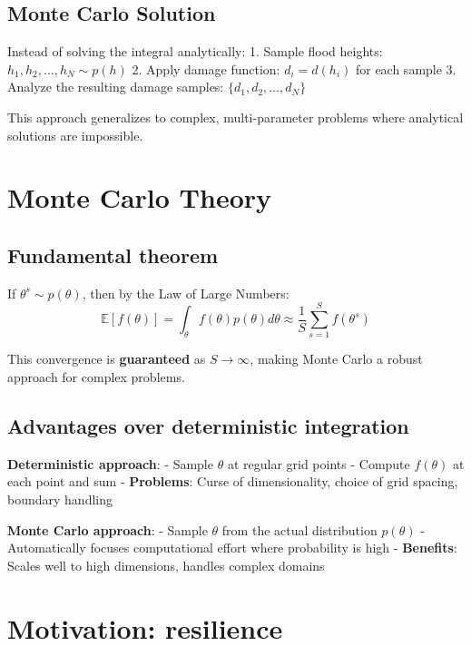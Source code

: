 \documentclass[
  letterpaper,
  DIV=11,
  numbers=noendperiod]{scrreprt}
\begin{document}
\subsection{Monte Carlo Solution}\label{monte-carlo-solution}

Instead of solving the integral analytically: 1. Sample flood heights:
\(h_1, h_2, \ldots, h_N \sim p(h)\) 2. Apply damage function:
\(d_i = d(h_i)\) for each sample 3. Analyze the resulting damage
samples: \(\{d_1, d_2, \ldots, d_N\}\)

This approach generalizes to complex, multi-parameter problems where
analytical solutions are impossible.

\section{Monte Carlo Theory}\label{monte-carlo-theory}

\subsection{Fundamental theorem}\label{fundamental-theorem}

If \(\theta^s \sim p(\theta)\), then by the Law of Large Numbers: \[
\mathbb{E}[f(\theta)] = \int_{\theta} f(\theta) p(\theta) d\theta \approx \frac{1}{S} \sum_{s=1}^S f(\theta^s)
\]

This convergence is \textbf{guaranteed} as \(S \to \infty\), making
Monte Carlo a robust approach for complex problems.

\subsection{Advantages over deterministic
integration}\label{advantages-over-deterministic-integration}

\textbf{Deterministic approach}: - Sample \(\theta\) at regular grid
points - Compute \(f(\theta)\) at each point and sum -
\textbf{Problems}: Curse of dimensionality, choice of grid spacing,
boundary handling

\textbf{Monte Carlo approach}: - Sample \(\theta\) from the actual
distribution \(p(\theta)\) - Automatically focuses computational effort
where probability is high - \textbf{Benefits}: Scales well to high
dimensions, handles complex domains

\section{Motivation: resilience}\label{motivation-resilience}
\end{document}

